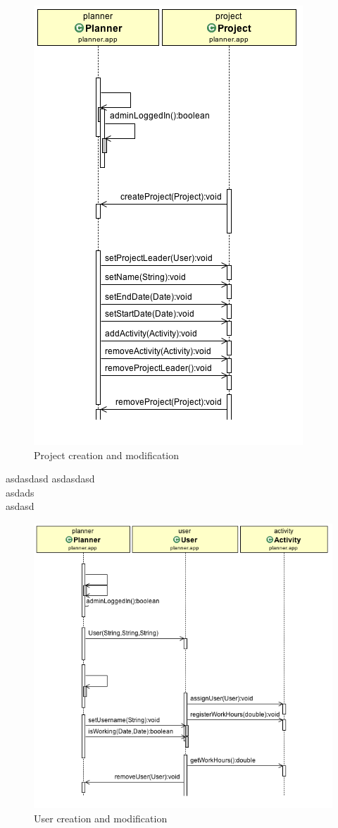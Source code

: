 \documentclass[a4paper,12pt]{article}
\begin{document}
\begin{figure}[htp]
\centering
\includegraphics[scale=0.5]{seq2.png}
\caption{Project creation and modification}
\end{figure}
asdasdasd
asdasdasd\\asdads\\asdasd
\newpage
\begin{figure}[htp]
\centering
\includegraphics[scale=0.5]{seq3.png}
\caption{User creation and modification}
\end{figure}
\end{document}
